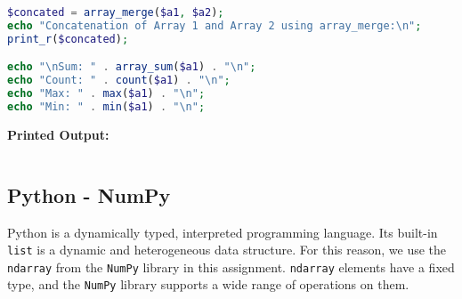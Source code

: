 \documentclass{article}
\begin{document}
\begin{itemize}
\begin{lstlisting}[language=PHP]
$concated = array_merge($a1, $a2);
echo "Concatenation of Array 1 and Array 2 using array_merge:\n";
print_r($concated);

echo "\nSum: " . array_sum($a1) . "\n";
echo "Count: " . count($a1) . "\n";
echo "Max: " . max($a1) . "\n";
echo "Min: " . min($a1) . "\n";

\end{lstlisting}
\textbf{Printed Output:}
\begin{verbatim}
\end{verbatim}
\end{itemize}
\newpage



\subsection{Python - NumPy}

Python is a dynamically typed, interpreted programming language. Its built-in \texttt{list} is a dynamic and heterogeneous data structure. For this reason, we use the \texttt{ndarray} from the \texttt{NumPy} library in this assignment. \texttt{ndarray} elements have a fixed type, and the \texttt{NumPy} library supports a wide range of operations on them.
\end{document}

